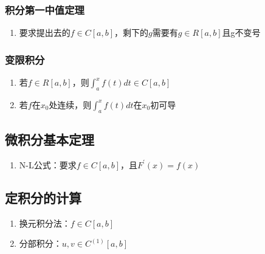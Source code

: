 \documentclass[
]{article}
\begin{document}
\hypertarget{ux79efux5206ux7b2cux4e00ux4e2dux503cux5b9aux7406}{%
\subsubsection{积分第一中值定理}\label{ux79efux5206ux7b2cux4e00ux4e2dux503cux5b9aux7406}}

\begin{enumerate}
\def\labelenumi{\arabic{enumi}.}
\item
  要求提出去的\(f\in C[a,b]\)，剩下的\(g\)需要有\(g\in R[a,b]\)且g不变号
\end{enumerate}

\hypertarget{ux53d8ux9650ux79efux5206}{%
\subsubsection{变限积分}\label{ux53d8ux9650ux79efux5206}}

\begin{enumerate}
\def\labelenumi{\arabic{enumi}.}
\item
  若\(f\in R[a,b]\)，则\(\int_a^xf(t)dt \in C[a,b]\)
\item
  若\(f\)在\(x_0\)处连续，则\(\int_a^xf(t)dt\)在\(x_0\)初可导
\end{enumerate}

\hypertarget{ux5faeux79efux5206ux57faux672cux5b9aux7406}{%
\subsection{微积分基本定理}\label{ux5faeux79efux5206ux57faux672cux5b9aux7406}}

\begin{enumerate}
\def\labelenumi{\arabic{enumi}.}
\item
  N-L公式：要求\(f\in C[a,b]\)，且\(F^\prime(x)=f(x)\)
\end{enumerate}

\hypertarget{ux5b9aux79efux5206ux7684ux8ba1ux7b97}{%
\subsection{定积分的计算}\label{ux5b9aux79efux5206ux7684ux8ba1ux7b97}}

\begin{enumerate}
\def\labelenumi{\arabic{enumi}.}
\item
  换元积分法：\(f\in C[a,b]\)
\item
  分部积分：\(u,v\in C^{(1)}[a,b]\)
\end{enumerate}
\end{document}
